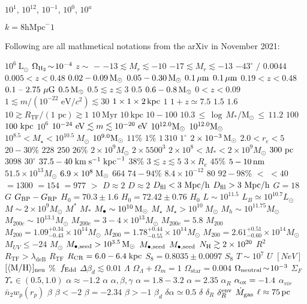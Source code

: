 $10^{1}$, $10^{12}$, $10^{-1}$, $10^0$, $10^{a}$

$k=8\mathrm{hMpc}^-1$


Following are all mathmetical notations from the arXiv in November 2021:

$ 10^6 ~ \mathrm{L}_\odot$  $ \Omega_{\rm H_2} \! \sim \! 10^{-4}$  $ z\!\sim$  $-$  $-13 \lesssim M_r \lesssim -10$  $-17 \lesssim M_r \lesssim -13$  $-43^{\circ}$  $/$  $0.0044$  $0.005 < z < 0.48$  $0.02-0.09 \, {\rm M}_\odot$  $0.05-0.30 \, {\rm M}_\odot$  $0.1 \, {\rm \mu m}$  $0.1 \, {\rm \mu m}$  $0.19<z<0.48$  $0.1~\text{--}~2.75~\mu{\rm G}$  $0.5 \, {\rm M}_\odot$  $0.5 \lesssim z \lesssim 3$  $0.5$  $0.6-0.8 \, {\rm M}_\odot$  $0<z<0.09$  $1 \lesssim m/(10^{-22} \text{ eV}/c^2) \lesssim 30$  $1 \times 1 \times 2 \, {\rm kpc}$  $1$  $1+z\simeq 7.5$  $1.5$  $1.6$  $10 \gtrsim R_\text{TF}/(1 \text{ pc}) \gtrsim 1$  $10 ~\text{Myr}$  $10 ~\text{kpc}$  $10-100$ $10.3\,\leqslant\,\log\,M_{\ast}/\mathrm{M_{\odot}}\,\leqslant\,11.2$ $100$ $100~{\rm kpc}$ $10^6$ $10^{-24}~{\rm eV}\lesssim m\lesssim10^{-20}~{\rm eV}$ $10^{12.0}\rm{M_{\odot}}$ $10^{12.0}{\rm M_\odot}$ $10^{8.5}<M_\star<10^{10.5}~M_\odot$ $10^{9.0}{\rm M_\odot}$  $11\%$  $1\%$  $1\,310$  $1^\circ$  $2 \times 10^{-3} \, {\rm M}_\odot$  $2.0<r_e<5$  $20-30\%$  $228$  $250$  $26\%$  $2\times 10^9 M_\odot$  $2\times 5500^3$  $2\times10^8<M_*<2\times10^9 M_{\odot}$  $300~{\rm pc}$  $3098$  $30^\circ$  $37.5-40\; {\rm km}\;{\rm s}^{-1}\;{\rm kpc}^{-1}$  $38\%$  $3\lesssim{} z \lesssim{} 5$  $3\times R_e$  $45\%$  $5-10 {\, {\rm nm}}$  $51.5\times 10^{13} M_\odot$  $6.9\times10^8\; {\rm M}_{\odot}$  $664$  $74-94 \%$  $8.4 \times 10^{-12}$  $80$  $92-98 \%$  $<$  $<40$  $=1300$  $=154$  $=977$  $>$  $D \approx 2$  $D\approx 2$  $D_{\rm{fil}}<3\ \rm{Mpc}/h$  $D_{\rm{fil}}>3\ \rm{Mpc}/h$  $G = 18$  $G$  $G_{\rm BP} - G_{\rm RP}$  $H_0 = 70.3 \pm 1.6$  $H_0 = 72.42 \pm 0.76$  $H_0$  $L \sim 10^{11.5}$  $L_B\simeq 10^{10.7}L_\odot$  $M \sim 2\times 10^9 M_\odot$  $M^*$  $M_*$  $M_\bullet \sim 10^{10} \,{\rm M_\odot}$  $M_\star$  $M_\star>10^{10}~M_\odot$  $M_h \sim 10^{11.75} M_\odot$  $M_{200c} \sim 10^{13.1} M_{\odot}$  $M_{200c}=3-4 \times 10^{13}M_\odot$  $M_{200c}=5.8$  $M_{200}$  $M_{200}=1.09_{-0.43}^{+0.34}\times10^{14} M_{\odot}$  $M_{200}=1.78_{-0.55}^{+0.44}\times10^{14} M_{\odot}$  $M_{200}=2.61_{-0.60}^{+0.51}\times10^{14} M_{\odot}$  $M_{UV} \leq -24$  $M_{\odot}$  $M_{\rm \bullet, seed} > 10^{3.5} \,{\rm M_\odot}$  $M_{\rm \bullet, seed}$  $M_{\rm \bullet, seed}$  $N_{\rm H} \gtrsim 2\times10^{20}$  $R^2$  $R_\text{TF} > \lambda_\text{deB}$  $R_\text{TF}$  $R_{\rm CR}=6.0-6.4\;{\rm kpc}$  $S_8 = 0.8035 \pm 0.0097$  $S_8$  $T\sim 10^7$  $U$  $[NeV]$  $[\langle{}{\rm M/H}\rangle{}]_{\rm neu}$  $\%$  $\,f_{\rm Edd}$  $\Delta\beta_d \lesssim 0.01$  $\Lambda$  $\Omega_\Lambda+\Omega_m=1$  $\Omega_\mathrm{star}=0.004$  $\Omega_{\rm neutral} \!\sim\! 10^{-3}$  $\Sigma_F$  $\Upsilon_* \in (0.5, 1.0)$  $\alpha \approx -1.2$  $\alpha$  $\alpha,\beta,\gamma$  $\alpha=1.8-3.2$  $\alpha=2.35$  $\alpha_R$  $\alpha_{\rm ox}=-1.4$  $\alpha_{vir}$  $\bar{n}_2w_p(r_p)$  $\beta$  $\beta<-2$  $\beta=-2.34$  $\beta>-1$  $\beta_d$  $\delta \alpha\simeq 0.5$  $\delta$  $\delta_R$  $\delta_R^{\rm env}$  $\dot{M}_{\rm{gas}}$  $\ell \approx 75 \, {\rm pc}$  